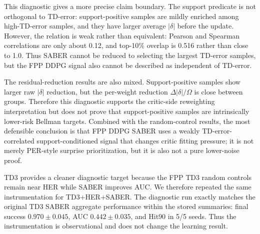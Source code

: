 \documentclass[letterpaper]{article}
\begin{document}
This diagnostic gives a more precise claim boundary. The support predicate is not orthogonal to TD-error: support-positive samples are mildly enriched among high-TD-error samples, and they have larger average \(|\delta|\) before the update. However, the relation is weak rather than equivalent: Pearson and Spearman correlations are only about 0.12, and top-10\% overlap is 0.516 rather than close to 1.0. Thus SABER cannot be reduced to selecting the largest TD-error samples, but the FPP DDPG signal also cannot be described as independent of TD-error.

The residual-reduction results are also mixed. Support-positive samples show larger raw \(|\delta|\) reduction, but the per-weight reduction \(\Delta|\delta|/\Omega\) is close between groups. Therefore this diagnostic supports the critic-side reweighting interpretation but does not prove that support-positive samples are intrinsically lower-risk Bellman targets. Combined with the random-control results, the most defensible conclusion is that FPP DDPG SABER uses a weakly TD-error-correlated support-conditioned signal that changes critic fitting pressure; it is not merely PER-style surprise prioritization, but it is also not a pure lower-noise proof.

TD3 provides a cleaner diagnostic target because the FPP TD3 random controls remain near HER while SABER improves AUC. We therefore repeated the same instrumentation for TD3+HER+SABER. The diagnostic run exactly matches the original TD3 SABER aggregate performance within the stored summaries: final success \(0.970 \pm 0.045\), AUC \(0.442 \pm 0.035\), and Hit90 in 5/5 seeds. Thus the instrumentation is observational and does not change the learning result.
\end{document}
